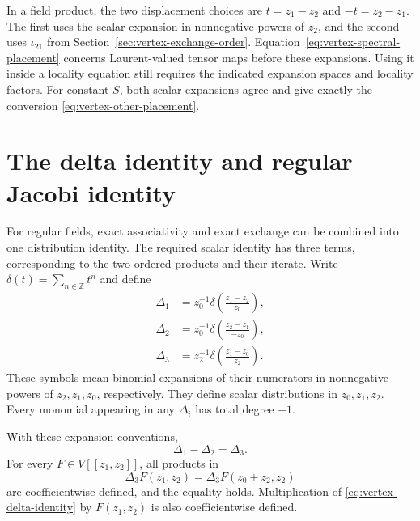 In a field product, the two displacement choices are $t=z_1-z_2$
and $-t=z_2-z_1$.
The first uses the scalar expansion in nonnegative powers of $z_2$,
and the second uses $\iota_{21}$ from
Section~\ref{sec:vertex-exchange-order}.
Equation~\eqref{eq:vertex-spectral-placement} concerns Laurent-valued
tensor maps before these expansions.
Using it inside a locality equation still requires the indicated
expansion spaces and locality factors.
For constant $S$, both scalar expansions agree and give exactly
the conversion \eqref{eq:vertex-other-placement}.

\section{The delta identity and regular Jacobi identity}
\label{sec:vertex-delta}

For regular fields, exact associativity and exact exchange can be
combined into one distribution identity.
The required scalar identity has three terms, corresponding to the
two ordered products and their iterate.
Write
$\delta(t)=\sum_{n\in\mathbb Z}t^n$ and define
\[
 \begin{aligned}
 \Delta_1&=z_0^{-1}\delta\left(\frac{z_1-z_2}{z_0}\right),\\
 \Delta_2&=z_0^{-1}\delta\left(\frac{z_2-z_1}{-z_0}\right),\\
 \Delta_3&=z_2^{-1}\delta\left(\frac{z_1-z_0}{z_2}\right).
 \end{aligned}
\]
These symbols mean binomial expansions of their numerators in
nonnegative powers of $z_2,z_1,z_0$, respectively.
They define scalar distributions in $z_0,z_1,z_2$.
Every monomial appearing in any $\Delta_i$ has total degree $-1$.

\begin{lemma}\label{lem:vertex-delta-identity}
With these expansion conventions,
\begin{equation}\label{eq:vertex-delta-identity}
 \Delta_1-\Delta_2=\Delta_3.
\end{equation}
For every $F\in V[[z_1,z_2]]$, all products in
\[
 \Delta_3F(z_1,z_2)=\Delta_3F(z_0+z_2,z_2)
\]
are coefficientwise defined, and the equality holds.
Multiplication of \eqref{eq:vertex-delta-identity} by $F(z_1,z_2)$
is also coefficientwise defined.
\end{lemma}

